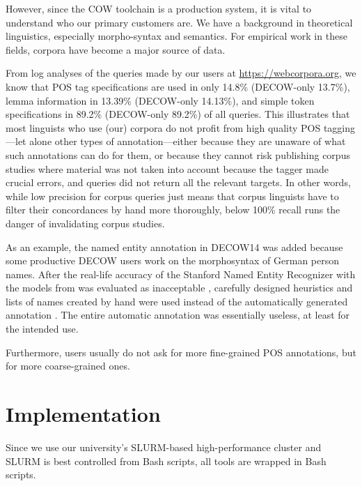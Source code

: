 \documentclass[11pt]{article}
\begin{document}
However, since the COW toolchain is a production system, it is vital to understand who our primary customers are.
We have a background in theoretical linguistics, especially morpho-syntax and semantics.
For empirical work in these fields, corpora have become a major source of data.

From log analyses of the queries made by our users at \url{https://webcorpora.org}, we know that POS tag specifications are used in only 14.8\% (DECOW-only 13.7\%), lemma information in 13.39\% (DECOW-only 14.13\%), and simple token specifications in 89.2\% (DECOW-only 89.2\%) of all queries.
This illustrates that most linguists who use (our) corpora do not profit from high quality POS tagging---let alone other types of annotation---either because they are unaware of what such annotations can do for them, or because they cannot risk publishing corpus studies where material was not taken into account because the tagger made crucial errors, and queries did not return all the relevant targets.
In other words, while low precision for corpus queries just means that corpus linguists have to filter their concordances by hand more thoroughly, below 100\% recall runs the danger of invalidating corpus studies.

As an example, the named entity annotation in DECOW14 was added because some productive DECOW users work on the morphosyntax of German person names.
After the real-life accuracy of the Stanford Named Entity Recognizer with the models from  was evaluated as inacceptable \cite{Helmers2013}, carefully designed heuristics and lists of names created by hand were used instead of the automatically generated annotation \cite{Ackermann2016}.
The entire automatic annotation was essentially useless, at least for the intended use.

Furthermore, users usually do not ask for more fine-grained POS annotations, but for more coarse-grained ones.

\section{Implementation}
\label{sec:implementation}

Since we use our university's SLURM-based high-performance cluster and SLURM is best controlled from Bash scripts, all tools are wrapped in Bash scripts.
\end{document}
